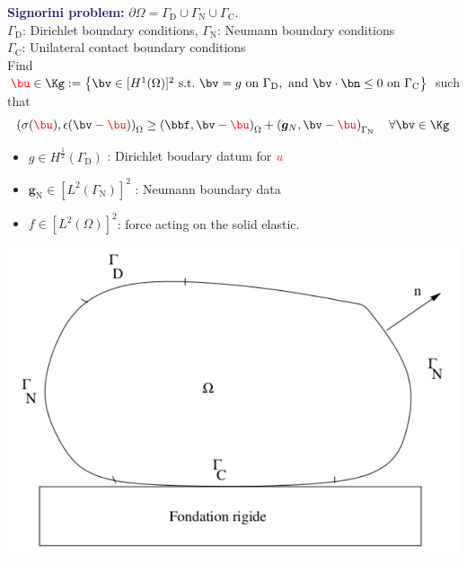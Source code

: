 \documentclass[aspectratio=169]{beamer}
\begin{document}
\begin{frame}
{{}}
\end{frame}
\begin{frame}
  \textcolor{midnightblue}{\textbf{Signorini problem:}}
  $\partial \Omega = \Gamma_{\mathrm{D}} \cup \Gamma_{\mathrm{N}} \cup \Gamma_{\mathrm{C}}$. \\
  $\Gamma_{\mathrm{D}}$: Dirichlet boundary conditions, $\Gamma_{\mathrm{N}}$: Neumann boundary conditions \\
  $\Gamma_{\mathrm{C}}$: Unilateral contact boundary conditions
  \\
  \vspace*{0.1 cm}
  Find $\textcolor{red}{\bu} \in \Kg := \left\{ \bv \in [H^1(\Omega)]^2 \ \text{s.t.} \ \bv=g \ \text{on} \ \Gamma_{\mathrm{D}}, \ \text{and} \ \bv\cdot \bn \leq 0 \ \text{on} \ \Gamma_{\mathrm{C}} \right\}$ such that
\begin{equation*}
\left( \sigma (\textcolor{red}{\bu}), \epsilon (\bv-\textcolor{red}{\bu}) \right)_{\Omega} \geq \left(\bbf,\bv-\textcolor{red}{\bu}\right)_{\Omega} + \left({\bm g}_{N}, \bv-\textcolor{red}{\bu} \right)_{\Gamma_{\mathrm{N}}}\quad \forall \bv \in \Kg
\end{equation*}

\begin{minipage}{0.55 \linewidth}
\begin{itemize}
\item $g \in H^{\frac{1}{2}}(\Gamma_{\mathrm{D}})$ : Dirichlet boudary datum for $\textcolor{red}{u}$
  \item  ${\bm g}_{\mathrm{N}} \in [L^2(\Gamma_{\mathrm{N}})]^2$ :  Neumann boundary data
  \item  $f \in [L^2(\Omega)]^2$: force acting on the solid elastic.
\end{itemize}
\end{minipage}
\hfill
\begin{minipage}{0.42 \linewidth}
\includegraphics[scale=0.4]{image_signorini}
\end{minipage}
\end{frame}
\end{document}
